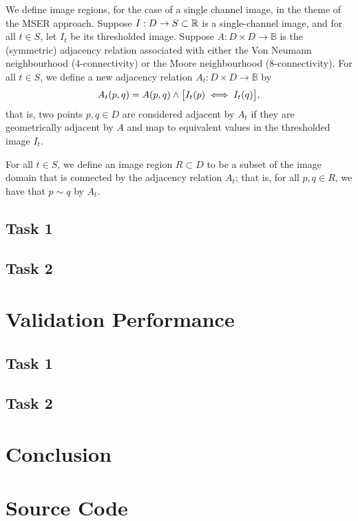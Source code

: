 \documentclass[draft]{article}
\begin{document}
We define image regions, for the case of a single channel image, in the theme of
the MSER approach.
Suppose $I : D \to S \subset \mathbb{R}$ is a single-channel image, and for all
$t \in S$, let $I_{t}$ be its thresholded image.
Suppose $A : D \times D \to \mathbb{B}$ is the (symmetric) adjacency relation
associated with either the Von Neumann neighbourhood (4-connectivity) or the
Moore neighbourhood (8-connectivity).
For all $t \in S$, we define a new adjacency relation
$A_{t} : D \times D \to \mathbb{B}$ by
\begin{equation}
  \label{eq:def-adjacency-threshold}
  A_{t}\lr{p, q}
  =
  A\lr{p, q}
  \wedge
  \lrsq[\big]
  {
    I_{t}\lr{p}
    \iff
    I_{t}\lr{q}
  }
  ,
\end{equation}
that is, two points $p, q \in D$ are considered adjacent by $A_{t}$ if they are
geometrically adjacent by $A$ and map to equivalent values in the thresholded
image $I_{t}$.

For all $t \in S$, we define an image region $R \subset D$ to be a subset of
the image domain that is connected by the adjacency relation $A_{t}$; that is,
for all $p, q \in R$, we have that $p \sim q$ by $A_{t}$.

\subsection{Task 1}
\label{sec:imp-task-1}

\subsection{Task 2}
\label{sec:imp-task-2}

\section{Validation Performance}
\label{sec:val-per}

\subsection{Task 1}
\label{sec:val-task-1}

\subsection{Task 2}
\label{sec:val-task-2}

\section{Conclusion}
\label{sec:conclusion}

\clearpage

\appendix

\section{Source Code}
\label{sec:source-code}
\end{document}
